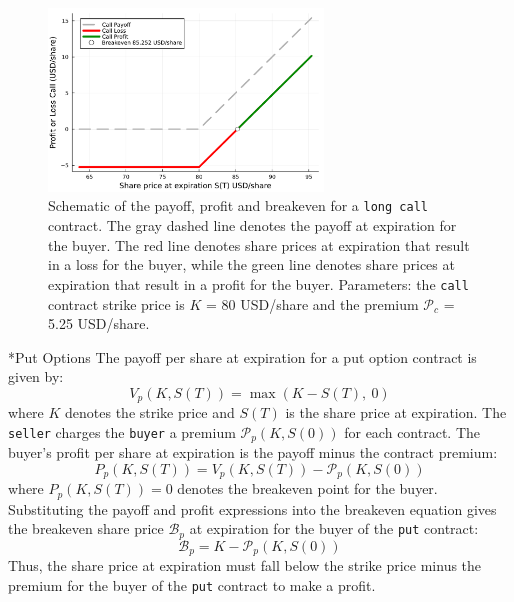 \documentclass[11pt]{article}
\makeatletter
\theoremstyle{definition}
\renewcommand\subsubsection{\@startsection
	{subsubsection}{2}{0mm}
	{-0.05in}
	{-0.5\baselineskip}
	{\normalfont\normalsize\itshape\bfseries}}
\makeatother
\begin{document}
\begin{figure}[ht]
    \centering
    \includegraphics[width=0.65\textwidth]{./figs/Fig-Example-Call-K80-62DTE.pdf}
    \caption{Schematic of the payoff, profit and breakeven for a \texttt{long call} 
	contract. The gray dashed line denotes the payoff at expiration for the buyer.
	The red line denotes share prices at expiration that result in a loss for the buyer, 
	while the green line denotes share prices at expiration that result in a profit for the buyer.
	Parameters: the \texttt{call} 
	contract strike price is $K$ = 80 USD/share and the premium $\mathcal{P}_{c}$ = 5.25 USD/share.}\label{fig:call-payoff-profit-breakeven-diagram}
\end{figure}


\subsubsection*{Put Options}
The payoff per share at expiration for a put option contract is given by:
\begin{equation}
V_{p}(K,S(T)) = \max\left(K - S(T),~0\right)
\end{equation}
where $K$ denotes the strike price and $S(T)$ is the share price at expiration. 
The \texttt{seller} charges the \texttt{buyer} a premium $\mathcal{P}_{p}(K,S(0))$ for each contract.
The buyer's profit per share at expiration is the payoff minus the contract premium:
\begin{equation}
P_{p}(K,S(T)) = V_{p}(K,S(T)) -  \mathcal{P}_{p}(K,S(0))
\end{equation}
where $P_{p}(K,S(T)) = 0$ denotes the breakeven point for the buyer. 
Substituting the payoff and profit expressions into the breakeven equation gives the breakeven share price $\mathcal{B}_{p}$ at expiration for the buyer 
of the \texttt{put} contract:
\begin{equation}
\mathcal{B}_{p} = K - \mathcal{P}_{p}(K,S(0))
\end{equation}
Thus, the share price at expiration must fall below the strike price minus the premium for the buyer of the \texttt{put} 
contract to make a profit.
\end{document}
